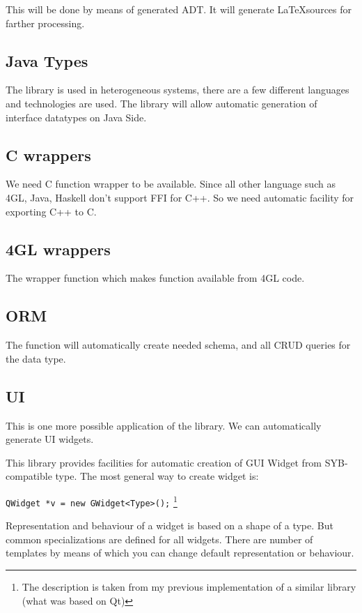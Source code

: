 \documentclass[a4paper]{article}
\begin{document}
This will be done by means of generated ADT. It will generate \LaTeX sources for farther processing.

\subsection{Java Types}

The library is used in heterogeneous systems, there are a few different languages and technologies are used.
The library will allow automatic generation of interface datatypes on Java Side.

\subsection{C wrappers}

We need C function wrapper to be available. Since all other language such as 4GL, Java, Haskell don't support FFI for C++. 
So we need automatic facility for exporting C++ to C.

\subsection{4GL wrappers}

The wrapper function which makes function available from 4GL code.

\subsection{ORM}

The function will automatically create needed schema, and all CRUD queries for the data type.

\subsection{UI} 
This is one more possible application of the library. We can automatically generate UI widgets.

This library provides facilities for automatic creation of GUI Widget from SYB-compatible type.
The most general way to create widget is:

\lstinline{QWidget *v = new GWidget<Type>();} \footnote{The description is taken from my previous implementation of a similar library 
(what was based on Qt)}

Representation and behaviour of a widget is based on a shape of a type.
But common specializations are defined for all widgets.
There are number of templates by means of which you can change default representation or behaviour.
\end{document}
